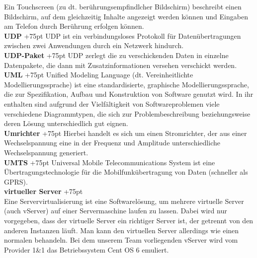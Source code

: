 \documentclass[fontsize = 12pt, paper = a4]{scrreprt}
\begin{document}
{Ein Touchscreen (zu dt. berührungsempfindlcher Bildschirm) beschreibt einen Bildschirm, auf dem gleichzeitig Inhalte angezeigt werden können und Eingaben am Telefon durch Berührung erfolgen können.\\

\textbf{UDP}
\hangindent+75pt 
\hspace*{13mm}
UDP ist ein verbindungsloses Protokoll für Datenübertragungen zwischen zwei Anwendungen durch ein Netzwerk hindurch.\\

\textbf{UDP-Paket}
\hangindent+75pt 
\hspace*{0mm}
UDP zerlegt die zu verschickenden Daten in einzelne Datenpakete, die dann mit Zusatzinformationen versehen verschickt werden.\\

\textbf{UML}
\hangindent+75pt 
\hspace*{13mm}
Unified Modeling Language (dt. Vereinheitlichte Modellierungssprache)  ist eine standardisierte, graphische Modellierungssprache, die zur Spezifikation, Aufbau und Konstruktion von Software genutzt wird. In ihr enthalten sind aufgrund der Vielfältigkeit von Softwareproblemen viele verschiedene Diagrammtypen, die sich zur Problembeschreibung beziehungsweise deren Lösung unterschiedlich gut eignen.\\

\textbf{Umrichter}
\hangindent+75pt 
\hspace*{2.5mm}
Hierbei handelt es sich um einen Stromrichter, der aus einer Wechselspannung eine in der Frequenz und Amplitude unterschiedliche Wechselspannung generiert.\\

\textbf{UMTS}
\hangindent+75pt 
\hspace*{10.5mm}
Universal Mobile Telecommunications System ist eine Übertragungstechnologie für die Mobilfunkübertragung von Daten (schneller als GPRS).\\

\textbf{virtueller Server}
\hangindent+75pt 
\\
Eine Servervirtualisierung ist eine Softwarelösung, um mehrere virtuelle Server (auch vServer) auf einer Servermaschine laufen zu lassen. Dabei wird nur vorgegeben, dass der virtuelle Server ein richtiger Server ist, der getrennt von den anderen Instanzen läuft. Man kann den virtuellen Server allerdings wie einen normalen behandeln. Bei dem unserem Team vorliegenden vServer wird vom Provider 1\&1 das Betriebssystem Cent OS 6 emuliert.\\

}
\end{document}
